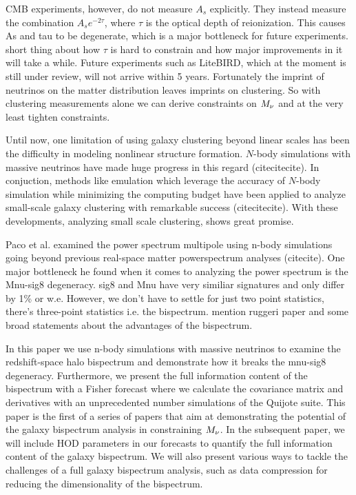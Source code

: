 CMB experiments, however, do not measure $A_s$ explicitly. They instead measure the 
combination $A_se^{-2\tau}$, where $\tau$ is the optical depth of reionization. 
This causes As and tau to be degenerate, which is a major bottleneck for future experiments.
short thing about how $\tau$ is hard to constrain and how major improvements in it 
will take a while. Future experiments such as LiteBIRD, which at the moment is still
under review, will not arrive within 5 years. 
Fortunately the imprint of neutrinos on the matter distribution leaves imprints
on clustering. So with clustering measurements alone we can derive constraints 
on $M_\nu$ and at the very least tighten constraints.  

Until now, one limitation of using galaxy clustering beyond linear scales has been 
the difficulty in modeling nonlinear structure formation. $N$-body simulations with
massive neutrinos have made huge progress in this regard (citecitecite). In 
conjuction, methods like emulation which leverage the accuracy of $N$-body simulation
while minimizing the computing budget have been applied to analyze small-scale galaxy
clustering with remarkable success (citecitecite). With these developments, analyzing 
small scale clustering, shows great promise. 

Paco et al. examined the power spectrum multipole using n-body simulations going beyond
previous real-space matter powerspectrum analyses (citecite). One major bottleneck he 
found when it comes to analyzing the power spectrum is the Mnu-sig8 degeneracy. 
sig8 and Mnu have very similiar signatures and only differ by 1\% or w.e. 
However, we don't have to settle for just two point statistics, there's three-point 
statistics i.e. the bispectrum. mention ruggeri paper and some broad statements about
the advantages of the bispectrum. 

In this paper we use n-body simulations with massive neutrinos to examine the 
redshift-space halo bispectrum and demonstrate how it breaks the mnu-sig8 degeneracy. 
Furthermore, we present the full information content of the bispectrum with a Fisher 
forecast where we calculate the covariance matrix and derivatives with an unprecedented 
number simulations of the Quijote suite. This paper is the first of a series of 
papers that aim at demonstrating the potential of the galaxy bispectrum analysis in 
constraining $M_\nu$. In the subsequent paper, we will include HOD parameters in our 
forecasts to quantify the full information content of the galaxy bispectrum. We will
also present various ways to tackle the challenges of a full galaxy bispectrum analysis, 
such as data compression for reducing the dimensionality of the bispectrum. 

